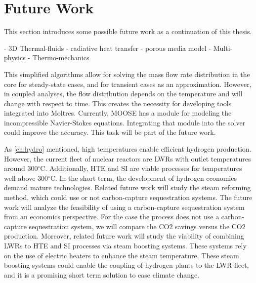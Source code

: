 \section{Future Work}

This section introduces some possible future work as a continuation of this thesis.

- 3D Thermal-fluids
	- radiative heat transfer
	- porous media model
- Multi-physics
- Thermo-mechanics

This simplified algorithms allow for solving the mass flow rate distribution in the core for steady-state cases, and for transient cases as an approximation.
However, in coupled analyses, the flow distribution depends on the temperature and will change with respect to time.
This creates the necessity for developing tools integrated into Moltres.
Currently, MOOSE has a module for modeling the incompressible Navier-Stokes equations.
Integrating that module into the solver could improve the accuracy.
This task will be part of the future work.





As \ref{ch:hydro} mentioned, high temperatures enable efficient hydrogen production.
However, the current fleet of nuclear reactors are LWRs with outlet temperatures around 300$^{\circ}$C.
Additionally, HTE and SI are viable processes for temperatures well above 300$^{\circ}$C.
In the short term, the development of hydrogen economies demand mature technologies.
Related future work will study the steam reforming method, which could use or not carbon-capture sequestration systems.
The future work will analyze the feasibility of using a carbon-capture sequestration system from an economics perspective.
For the case the process does not use a carbon-capture sequestration system, we will compare the \gls{CO2} savings versus the \gls{CO2} production.
Moreover, related future work will study the viability of combining LWRs to HTE and SI processes via steam boosting systems.
These systems rely on the use of electric heaters to enhance the steam temperature.
These steam boosting systems could enable the coupling of hydrogen plants to the LWR fleet, and it is a promising short term solution to ease climate change.

